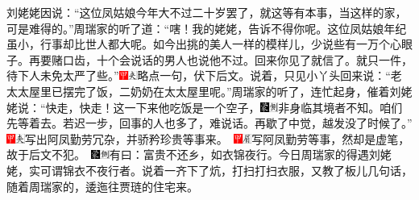 刘姥姥因说：``这位凤姑娘今年大不过二十岁罢了，就这等有本事，当这样的家，可是难得的。''周瑞家的听了道：``嗐！我的姥姥，告诉不得你呢。这位凤姑娘年纪虽小，行事却比世人都大呢。如今出挑的美人一样的模样儿，少说些有一万个心眼子。再要赌口齿，十个会说话的男人也说他不过。回来你见了就信了。就只一件，待下人未免太严了些。''{\includegraphics[width=3mm]{../Images/00002}\includegraphics[width=3mm]{../Images/00012}\footnotesize \kaishu 略点一句，伏下后文。}说着，只见小丫头回来说：``老太太屋里已摆完了饭，二奶奶在太太屋里呢。''周瑞家的听了，连忙起身，催着刘姥姥说：``快走，快走！这一下来他吃饭是一个空子，{\includegraphics[width=3mm]{../Images/00006}\includegraphics[width=3mm]{../Images/00011}\footnotesize \kaishu 非身临其境者不知。}咱们先等着去。若迟一步，回事的人也多了，难说话。再歇了中觉，越发没了时候了。''{{\includegraphics[width=3mm]{../Images/00002}\includegraphics[width=3mm]{../Images/00012}\footnotesize \kaishu 写出阿凤勤劳冗杂，并骄矜珍贵等事来。　\includegraphics[width=3mm]{../Images/00002}\includegraphics[width=3mm]{../Images/00010}\footnotesize \kaishu 写阿凤勤劳等事，然却是虚笔，故于后文不犯。　}\includegraphics[width=3mm]{../Images/00006}\includegraphics[width=3mm]{../Images/00011}\footnotesize \kaishu 有曰：富贵不还乡，如衣锦夜行。今日周瑞家的得遇刘姥姥，实可谓锦衣不夜行者。}说着一齐下了炕，打扫打扫衣服，又教了板儿几句话，随着周瑞家的，逶迤往贾琏的住宅来。


